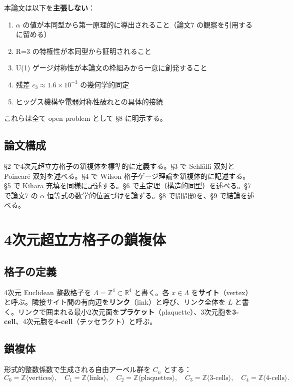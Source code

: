 \documentclass[a4paper,11pt]{ltjsarticle}
\begin{document}
本論文は以下を\textbf{主張しない}：

\begin{enumerate}
\item $\alpha$ の値が本同型から第一原理的に導出されること（論文7 の観察を引用するに留める）
\item R=3 の特権性が本同型から証明されること
\item U(1) ゲージ対称性が本論文の枠組みから一意に創発すること
\item 残差 $c_3 \approx 1.6 \times 10^{-3}$ の幾何学的同定
\item ヒッグス機構や電弱対称性破れとの具体的接続
\end{enumerate}

これらは全て open problem として §8 に明示する。

\subsection{論文構成}

§2 で4次元超立方格子の鎖複体を標準的に定義する。§3 で Schläfli 双対と Poincaré 双対を述べる。§4 で Wilson 格子ゲージ理論を鎖複体的に記述する。§5 で Kihara 充填を同様に記述する。§6 で主定理（構造的同型）を述べる。§7 で論文7 の $\alpha$ 恒等式の数学的位置づけを論ずる。§8 で開問題を、§9 で結論を述べる。

\section{4次元超立方格子の鎖複体}

\subsection{格子の定義}

4次元 Euclidean 整数格子を $\Lambda = \mathbb{Z}^4 \subset \mathbb{R}^4$ と書く。各 $x \in \Lambda$ を\textbf{サイト}（vertex）と呼ぶ。隣接サイト間の有向辺を\textbf{リンク}（link）と呼び、リンク全体を $L$ と書く。リンクで囲まれる最小2次元面を\textbf{プラケット}（plaquette）、3次元胞を\textbf{3-cell}、4次元胞を\textbf{4-cell}（テッセラクト）と呼ぶ。

\subsection{鎖複体}

形式的整数係数で生成される自由アーベル群を $C_n$ とする：
\[ C_0 = \mathbb{Z}\langle\text{vertices}\rangle, \quad C_1 = \mathbb{Z}\langle\text{links}\rangle, \quad C_2 = \mathbb{Z}\langle\text{plaquettes}\rangle, \quad C_3 = \mathbb{Z}\langle\text{3-cells}\rangle, \quad C_4 = \mathbb{Z}\langle\text{4-cells}\rangle. \]
\end{document}
